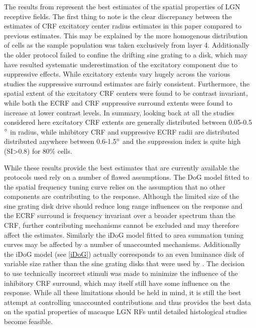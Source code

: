 The results from \cite{Sceniak2006} represent the best estimates of
the spatial properties of LGN receptive fields. The first thing to
note is the clear discrepancy between the estimates of CRF excitatory
center radius estimates in this paper compared to previous
estimates. This may be explained by the more homogenous distribution
of cells as the sample population was taken exclusively from layer
4. Additionally the older protocol failed to confine the drifting sine
grating to a disk, which may have resulted systematic underestimation
of the excitatory component due to suppressive effects. While
excitatory extents vary hugely across the various studies the
suppressive surround estimates are fairly consistent. Furthermore, the
spatial extent of the excitatory CRF centers were found to be contrast
invariant, while both the ECRF and CRF suppressive surround extents
were found to increase at lower contrast levels. In summary, looking
back at all the studies considered here excitatory CRF extents are
generally distributed between 0.05-0.5$\degree$ in radius, while
inhibitory CRF and suppressive ECRF radii are distributed distributed
anywhere between 0.6-1.5$\degree$ and the suppression index is quite
high (SI\textgreater0.8) for 80\% cells.

While these results provide the best estimates that are currently
available the protocols used rely on a number of flawed
assumptions. The DoG model fitted to the spatial frequency tuning
curve relies on the assumption that no other components are
contributing to the response. Although the limited size of the sine
grating disk drive should reduce long range influences on the response
and the ECRF surround is frequency invariant over a broader spectrum
than the CRF, further contributing mechanisms cannot be excluded and
may therefore affect the estimates. Similarly the iDoG model fitted to
area summation tuning curves may be affected by a number of
unaccounted mechanisms. Additionally the iDoG model (see \ref{iDoG})
actually corresponds to an even luminance disk of variable size rather
than the sine grating disks that were used by \cite{Sceniak2006}. The
decision to use technically incorrect stimuli was made to minimize the
influence of the inhibitory CRF surround, which may itself still have
some influence on the response. While all these limitations should be
held in mind, it is still the best attempt at controlling unaccounted
contributions and thus provides the best data on the spatial
properties of macaque LGN RFs until detailed histological studies
become feasible.

